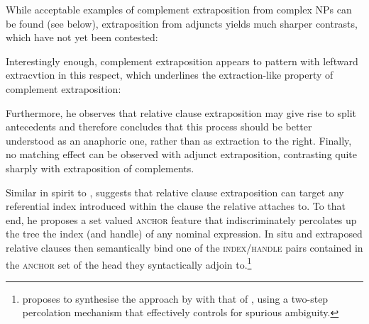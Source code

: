 \documentclass[output=paper
                ,modfonts
                ,nonflat
	        ,collection
	        ,collectionchapter
	        ,collectiontoclongg
 	        ,biblatex
                ,babelshorthands
                ,newtxmath
                ,draftmode
                ,colorlinks, citecolor=brown
]{./langsci/langscibook}
\begin{document}
{While acceptable examples of complement extraposition from complex NPs
can be found (see below), extraposition from adjuncts yields much
sharper contrasts, which have not yet been contested: 

\begin{exe}
  \ex
  \label{ex:ExtraAdj}
  \begin{xlist}

  \end{xlist}
\end{exe}


Interestingly enough, complement extraposition appears to pattern with
leftward extracvtion in this respect, which underlines the
extraction-like property of complement extraposition:

\begin{exe}
\end{exe}

Furthermore, he observes that relative clause extraposition may give
rise to split antecedents and therefore concludes that this process
should be better understood as an anaphoric one, rather than as
extraction to the right. Finally, no matching effect can be observed
with adjunct extraposition, contrasting quite sharply with
extraposition of complements.


Similar in spirit to \citet{culicover90:_extrap_and_compl_princ},
\citet{kiss_t02nllt} suggests that relative clause extraposition can
target any referential index introduced within the clause the relative
attaches to.  To that end, he proposes a set valued \textsc{anchor}
feature that indiscriminately percolates up the tree the index (and
handle) of any nominal expression. In situ and extraposed relative
clauses then semantically bind one of the \textsc{index/handle} pairs
contained in the \textsc{anchor} set of the head they syntactically
adjoin to.\footnote{\citet{crysmann_b04rlc} proposes to synthesise the
  approach by \citet{kiss_t02nllt} with that of \citet{Keller:95},
  using a two-step percolation mechanism that effectively controls for
  spurious ambiguity.} 

}
\end{document}
